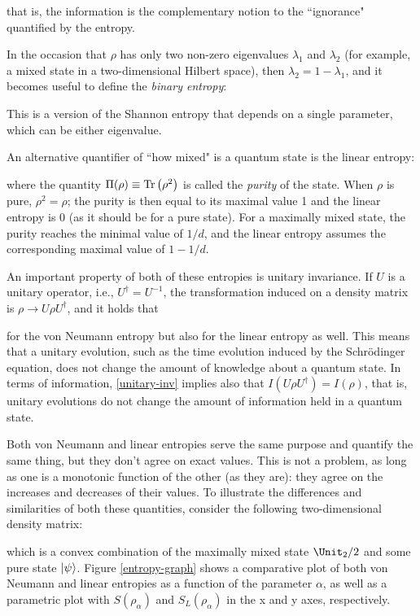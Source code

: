 \documentclass[12pt,a4paper,notitlepage]{report}
\begin{document}
%
that is, the information is the complementary notion to the ``ignorance" quantified by the entropy.

In the occasion that $\rho$ has only two non-zero eigenvalues $\lambda_1$ and $\lambda_2$ (for example, a mixed state in a two-dimensional Hilbert space), then $\lambda_2 = 1-\lambda_1$, and it becomes useful to define the {\it binary entropy}:

This is a version of the Shannon entropy that depends on a single parameter, which can be either eigenvalue.

An alternative quantifier of ``how mixed" is a quantum state is the linear entropy:

%
where the quantity $\Pi(\rho)\equiv\Tr\left(\rho^2\right)$ is called the {\it purity} of the state. When $\rho$ is pure, $\rho^2 = \rho$; the purity is then equal to its maximal value 1 and the linear entropy is 0 (as it should be for a pure state). For a maximally mixed state, the purity reaches the minimal value of $1/d$, and the linear entropy assumes the corresponding maximal value of $1-1/d$. 

An important property of both of these entropies is unitary invariance. If $U$ is a unitary operator, i.e., $U^\dagger = U^{-1}$, the transformation induced on a density matrix is $\rho \rightarrow U\rho U^\dagger$, and it holds that

%
for the von Neumann entropy but also for the linear entropy as well. This means that a unitary evolution, such as the time evolution induced by the Schrödinger equation, does not change the amount of knowledge about a quantum state. In terms of information, \eqref{unitary-inv} implies also that $I(U\rho U^\dagger) = I(\rho)$, that is, unitary evolutions do not change the amount of information held in a quantum state.

Both von Neumann and linear entropies serve the same purpose and quantify the same thing, but they don't agree on exact values. This is not a problem, as long as one is a monotonic function of the other (as they are): they agree on the increases and decreases of their values. To illustrate the differences and similarities of both these quantities, consider the following two-dimensional density matrix:

%
which is a convex combination of the maximally mixed state $\Unit_2/2$ and some pure state $\ket{\psi}$. Figure \ref{entropy-graph} shows a comparative plot of both von Neumann and linear entropies as a function of the parameter $\alpha$, as well as a parametric plot with $S(\rho_\alpha)$ and $S_L(\rho_\alpha)$ in the x and y axes, respectively.
\end{document}
